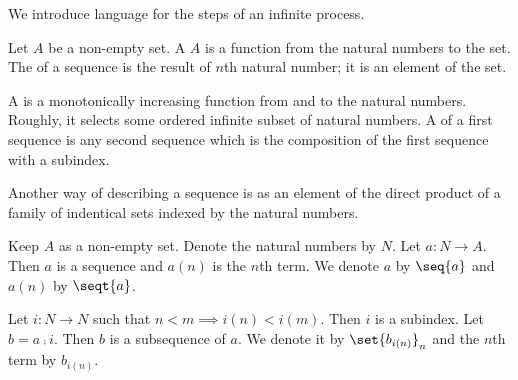 

We introduce language
for the steps of an
infinite process.


Let $A$ be a non-empty
set.
A  $A$
is a function
from the natural numbers to the
set.
The  of a sequence
is the result of $n$th natural
number; it is an element of
the set.

A  is a monotonically
increasing function from and to the
natural numbers.
Roughly,
it
selects some ordered infinite
subset of natural numbers.
A  of a first
sequence is any second sequence
which is the composition of the
first sequence with a subindex.


Another way of describing a sequence
is as an element of the direct product
of a family of indentical sets indexed
by the natural numbers.


Keep $A$ as a non-empty set.
Denote the natural numbers by $N$.
Let $a: N \to A$.
Then $a$ is a sequence and
$a(n)$ is the $n$th term.
We denote $a$ by
$\seq{a}$ and $a(n)$ by $\seqt{a}$.

Let $i: N \to N$ such that
$n < m \implies i(n) < i(m)$.
Then $i$ is a subindex.
Let $b = a \comp i$.
Then $b$ is a subsequence of $a$.
We denote it by
$\set{b_{i(n)}}_n$ and the $n$th
term by $b_{i(n)}$.
